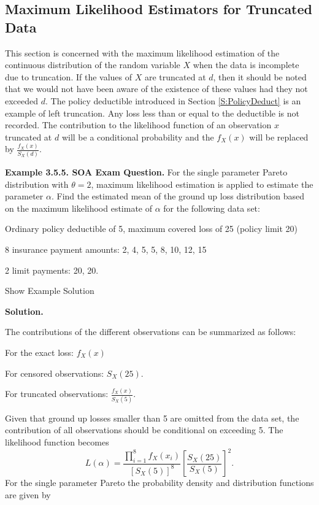 \documentclass[]{book}
\theoremstyle{definition}
\theoremstyle{definition}
\theoremstyle{definition}
\theoremstyle{remark}
\begin{document}
\subsection{Maximum Likelihood Estimators for Truncated
Data}\label{maximum-likelihood-estimators-for-truncated-data}

This section is concerned with the maximum likelihood estimation of the
continuous distribution of the random variable \(X\) when the data is
incomplete due to truncation. If the values of \(X\) are truncated at
\(d\), then it should be noted that we would not have been aware of the
existence of these values had they not exceeded \(d\). The policy
deductible introduced in Section \ref{S:PolicyDeduct} is an example of
left truncation. Any loss less than or equal to the deductible is not
recorded. The contribution to the likelihood function of an observation
\(x\) truncated at \(d\) will be a conditional probability and the
\(f_{X}\left( x \right)\) will be replaced by
\(\frac{f_{X}\left( x \right)}{S_{X}\left( d \right)}\).

\textbf{Example 3.5.5. SOA Exam Question.} For the single parameter
Pareto distribution with \(\theta = 2\), maximum likelihood estimation
is applied to estimate the parameter \(\alpha\). Find the estimated mean
of the ground up loss distribution based on the maximum likelihood
estimate of \(\alpha\) for the following data set:

Ordinary policy deductible of 5, maximum covered loss of 25 (policy
limit 20)

8 insurance payment amounts: 2, 4, 5, 5, 8, 10, 12, 15

2 limit payments: 20, 20.

Show Example Solution

\hypertarget{toggleExampleLoss.5.5}{}
\textbf{Solution.}

The contributions of the different observations can be summarized as
follows:

For the exact loss: \(f_{X}\left( x \right)\)

For censored observations: \(S_{X}\left( 25 \right)\).

For truncated observations:
\(\frac{f_{X}\left( x \right)}{S_{X}\left( 5 \right)}\).

Given that ground up losses smaller than 5 are omitted from the data
set, the contribution of all observations should be conditional on
exceeding 5. The likelihood function becomes
\[L\left( \alpha \right) = \frac{\prod_{i = 1}^{8}{f_{X}\left( x_{i} \right)}}{\left\lbrack S_{X}\left( 5 \right) \right\rbrack^{8}}\left\lbrack \frac{S_{X}\left( 25 \right)}{S_{X}\left( 5 \right)} \right\rbrack^{2}.\]
For the single parameter Pareto the probability density and distribution
functions are given by
\end{document}
